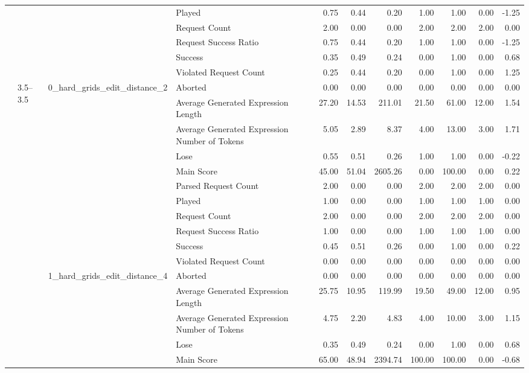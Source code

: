 \begin{tabular}{llllrrrrrrr}
 &  &  & Played & 0.75 & 0.44 & 0.20 & 1.00 & 1.00 & 0.00 & -1.25 \\
 &  &  & Request Count & 2.00 & 0.00 & 0.00 & 2.00 & 2.00 & 2.00 & 0.00 \\
 &  &  & Request Success Ratio & 0.75 & 0.44 & 0.20 & 1.00 & 1.00 & 0.00 & -1.25 \\
 &  &  & Success & 0.35 & 0.49 & 0.24 & 0.00 & 1.00 & 0.00 & 0.68 \\
 &  &  & Violated Request Count & 0.25 & 0.44 & 0.20 & 0.00 & 1.00 & 0.00 & 1.25 \\
\cline{2-11} \cline{3-11}
 & \multirow[t]{22}{*}{3.5--3.5} & \multirow[t]{11}{*}{0_hard_grids_edit_distance_2} & Aborted & 0.00 & 0.00 & 0.00 & 0.00 & 0.00 & 0.00 & 0.00 \\
 &  &  & Average Generated Expression Length & 27.20 & 14.53 & 211.01 & 21.50 & 61.00 & 12.00 & 1.54 \\
 &  &  & Average Generated Expression Number of Tokens & 5.05 & 2.89 & 8.37 & 4.00 & 13.00 & 3.00 & 1.71 \\
 &  &  & Lose & 0.55 & 0.51 & 0.26 & 1.00 & 1.00 & 0.00 & -0.22 \\
 &  &  & Main Score & 45.00 & 51.04 & 2605.26 & 0.00 & 100.00 & 0.00 & 0.22 \\
 &  &  & Parsed Request Count & 2.00 & 0.00 & 0.00 & 2.00 & 2.00 & 2.00 & 0.00 \\
 &  &  & Played & 1.00 & 0.00 & 0.00 & 1.00 & 1.00 & 1.00 & 0.00 \\
 &  &  & Request Count & 2.00 & 0.00 & 0.00 & 2.00 & 2.00 & 2.00 & 0.00 \\
 &  &  & Request Success Ratio & 1.00 & 0.00 & 0.00 & 1.00 & 1.00 & 1.00 & 0.00 \\
 &  &  & Success & 0.45 & 0.51 & 0.26 & 0.00 & 1.00 & 0.00 & 0.22 \\
 &  &  & Violated Request Count & 0.00 & 0.00 & 0.00 & 0.00 & 0.00 & 0.00 & 0.00 \\
\cline{3-11}
 &  & \multirow[t]{11}{*}{1_hard_grids_edit_distance_4} & Aborted & 0.00 & 0.00 & 0.00 & 0.00 & 0.00 & 0.00 & 0.00 \\
 &  &  & Average Generated Expression Length & 25.75 & 10.95 & 119.99 & 19.50 & 49.00 & 12.00 & 0.95 \\
 &  &  & Average Generated Expression Number of Tokens & 4.75 & 2.20 & 4.83 & 4.00 & 10.00 & 3.00 & 1.15 \\
 &  &  & Lose & 0.35 & 0.49 & 0.24 & 0.00 & 1.00 & 0.00 & 0.68 \\
 &  &  & Main Score & 65.00 & 48.94 & 2394.74 & 100.00 & 100.00 & 0.00 & -0.68 \\

\end{tabular}
